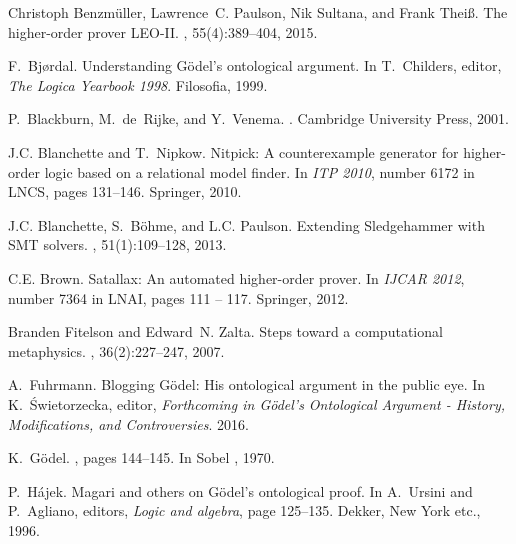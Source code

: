 \documentclass{article}
\begin{document}
\begin{thebibliography}{}
Christoph Benzm{\"u}ller, Lawrence~C. Paulson, Nik Sultana, and Frank
  Thei{\ss}.
\newblock The higher-order prover {LEO-II}.
, 55(4):389--404, 2015.

F.~Bj{\o}rdal.
\newblock Understanding {G\"{o}del’s} ontological argument.
\newblock In T.~Childers, editor, {\em The Logica Yearbook 1998}. Filosofia,
  1999.

P.~Blackburn, M.~de~Rijke, and Y.~Venema.
.
\newblock Cambridge University Press, 2001.

J.C. Blanchette and T.~Nipkow.
\newblock Nitpick: A counterexample generator for higher-order logic based on a
  relational model finder.
\newblock In {\em ITP 2010}, number 6172 in LNCS, pages 131--146. Springer,
  2010.

J.C. Blanchette, S.~B\"ohme, and L.C. Paulson.
\newblock Extending {Sledgehammer} with {SMT} solvers.
, 51(1):109--128, 2013.

C.E. Brown.
\newblock Satallax: An automated higher-order prover.
\newblock In {\em IJCAR 2012}, number 7364 in LNAI, pages 111 -- 117. Springer,
  2012.

Branden Fitelson and Edward~N. Zalta.
\newblock Steps toward a computational metaphysics.
, 36(2):227--247, 2007.

A.~Fuhrmann.
\newblock Blogging {G\"odel}: His ontological argument in the public eye.
\newblock In K.~\'{S}wi{e}torzecka, editor, {\em Forthcoming in
  \textit{G\"odel’s Ontological Argument - History, Modifications, and
  Controversies}}. 2016.

K.~G\"odel.
, pages 144--145.
\newblock In Sobel , 1970.

P.~H\'ajek.
\newblock Magari and others on {G\"odel’s} ontological proof.
\newblock In A.~Ursini and P.~Agliano, editors, {\em Logic and algebra}, page
  125–135. Dekker, New York etc., 1996.


\end{thebibliography}
\end{document}
